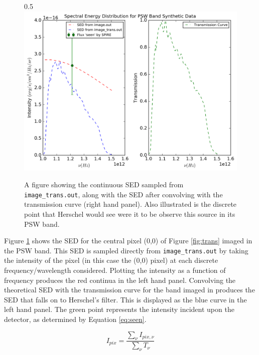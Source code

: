 \documentclass{report}
\begin{document}
\begin{figure}[h]{0.5\textwidth}
  \centering
  \includegraphics[scale=0.5]{../img/spectrum_psw_unweighted_v2}
  \caption[A figure showing the continuous SED sampled from \texttt{image\_trans.out}, along with the SED after convolving with the transmission curve (right hand panel). Also illustrated is the discrete point that Herschel would see were it to be observe this source in its PSW band.]{A figure showing the continuous SED sampled from \texttt{image\_trans.out}, along with the SED after convolving with the transmission curve (right hand panel). Also illustrated is the discrete point that Herschel would see were it to be observe this source in its PSW band.}
  \label{fig:SED_ex}
\end{figure}

Figure \ref{fig:SED_ex} shows the SED for the central pixel (0,0) of Figure \ref{fig:trans} imaged in the PSW band. This SED is sampled directly from \texttt{image\_trans.out} by taking the intensity of the pixel (in this case the (0,0) pixel) at each discrete frequency/wavelength considered. Plotting the intensity as a function of frequency produces the red continua in the left hand panel. Convolving the theoretical SED with the transmission curve for the band imaged in produces the SED that falls on to Herschel's filter. This is displayed as the blue curve in the left hand panel. The green point represents the intensity incident upon the detector, as determined by Equation \ref{eq:seen}.

\begin{equation}
  I_{pix} = \frac{\sum_{\nu} I_{pix,\nu}}{\sum_{\nu} T_{\nu}}
  \label{eq:seen}
\end{equation}
\end{document}
